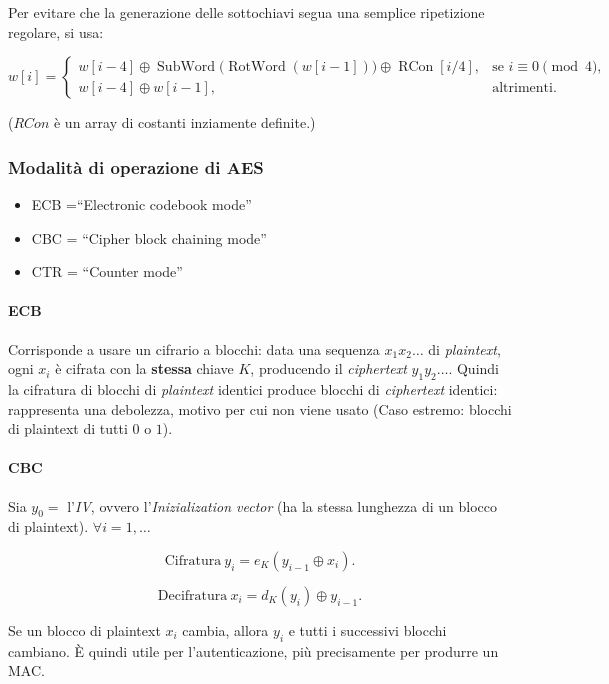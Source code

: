 Per evitare che la generazione delle sottochiavi segua una semplice ripetizione regolare, si usa:

\[
w[i] =
\begin{cases}
w[i-4] \oplus
\operatorname{SubWord}\bigl(\operatorname{RotWord}(w[i-1])\bigr)
\oplus \operatorname{RCon}[i/4],
& \text{se } i \equiv 0 \pmod{4}, \\[6pt]
w[i-4] \oplus w[i-1],
& \text{altrimenti}.
\end{cases}
\]

($RCon$ è un array di costanti inziamente definite.) 


\newpage
\subsubsection{Modalità di operazione di AES}
\begin{itemize}
    \item ECB  =``Electronic codebook mode''
    \item CBC = ``Cipher block chaining mode''
    \item CTR = ``Counter mode''
\end{itemize}

\paragraph{ECB} Corrisponde a usare un cifrario a blocchi: data una sequenza $x_1x_2 \dots $ di \textit{plaintext}, ogni $x_i$ è cifrata con la \textbf{stessa} chiave $K$, producendo il \emph{ciphertext} $y_1y_2 \dots $. Quindi la cifratura di blocchi di \emph{plaintext} identici produce blocchi di \emph{ciphertext} identici: rappresenta una debolezza, motivo per cui non viene usato (Caso estremo: blocchi di plaintext di tutti $0$ o $1$).

\paragraph{CBC} Sia $y_0=$ l'\textit{IV}, ovvero l'\textit{Inizialization vector} (ha la stessa lunghezza di un blocco di plaintext). $\forall i=1, \dots $ 

 \[ \text{Cifratura} \ 
y_i=e_K(y_{i-1} \oplus x_i). 
\] 

\[ \text{Decifratura} \ 
x_i=d_K(y_i) \oplus {y_{i-1}}.
\] 

\noindent Se un blocco di plaintext $x_i$ cambia, allora $y_i$ e tutti i successivi blocchi cambiano. È quindi utile per l'autenticazione, più precisamente per produrre un MAC.

